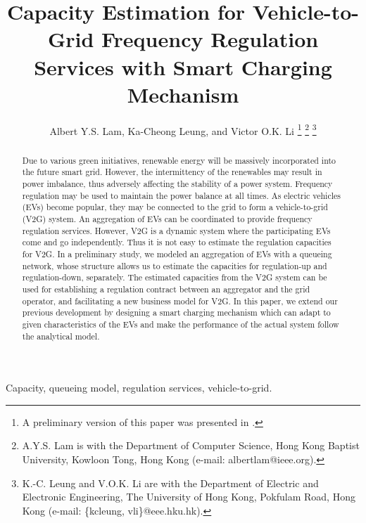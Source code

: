 \documentclass[journal]{IEEEtran}
\begin{document}
\title{Capacity Estimation for Vehicle-to-Grid Frequency Regulation Services with Smart Charging Mechanism}




\author{Albert Y.S. Lam, Ka-Cheong Leung, and Victor O.K. Li
\thanks{A preliminary version of this paper was presented in \cite{smartgridcomm2012}.}
\thanks{A.Y.S. Lam is with the Department of Computer Science, Hong Kong Baptist University, Kowloon Tong, Hong Kong (e-mail: albertlam@ieee.org).}
\thanks{K.-C. Leung and V.O.K. Li are with the Department
of Electric and Electronic Engineering, The University of Hong Kong, Pokfulam Road, 
Hong Kong (e-mail: \{kcleung, vli\}@eee.hku.hk).}}













\maketitle

\begin{abstract}
Due to various green initiatives, renewable energy will be massively incorporated into the future smart grid.  However, the intermittency of the renewables may result in power imbalance, thus adversely affecting the stability of a power system.  Frequency regulation may be used to maintain the power balance at all times.  As electric vehicles (EVs) become popular, they may be connected to the grid to form a vehicle-to-grid (V2G) system.  An aggregation of EVs can be coordinated to provide frequency regulation services.  However, V2G is a dynamic system where the participating EVs come and go independently. Thus it is not easy to estimate the regulation capacities for V2G. In a preliminary study, we modeled an aggregation of EVs with a queueing network, whose structure allows us to estimate the capacities for regulation-up and regulation-down, separately.  The estimated capacities from the V2G system can be used for establishing a regulation contract between an aggregator and the grid operator, and facilitating a new business model for V2G. In this paper, we extend our previous development by designing a smart charging mechanism which can adapt to given characteristics of the EVs and make the performance of the actual system follow the analytical model. 
\end{abstract}
\begin{IEEEkeywords}
Capacity, queueing model, regulation services, vehicle-to-grid.
\end{IEEEkeywords}
\end{document}
